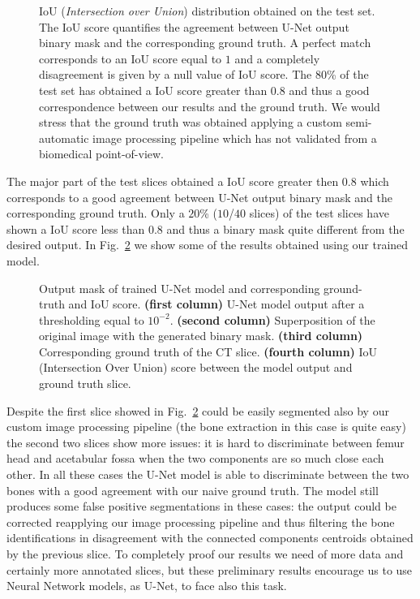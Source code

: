 \documentclass{standalone}
\begin{document}
\begin{figure}[htbp]
\centering
\def\svgwidth{0.85\textwidth}

\caption{IoU (\emph{Intersection over Union}) distribution obtained on the test set.
The IoU score quantifies the agreement between U-Net output binary mask and the corresponding ground truth.
A perfect match corresponds to an IoU score equal to $1$ and a completely disagreement is given by a null value of IoU score.
The $80$\% of the test set has obtained a IoU score greater than $0.8$ and thus a good correspondence between our results and the ground truth.
We would stress that the ground truth was obtained applying a custom semi-automatic image processing pipeline which has not validated from a biomedical point-of-view.
}
\label{fig:seg_iou}
\end{figure}

The major part of the test slices obtained a IoU score greater then $0.8$ which corresponds to a good agreement between U-Net output binary mask and the corresponding ground truth.
Only a $20$\% ($10$/$40$ slices) of the test slices have shown a IoU score less than $0.8$ and thus a binary mask quite different from the desired output.
In Fig.~\ref{fig:seg_res} we show some of the  results obtained using our trained model.

\begin{figure}[htbp]
\centering
\def\svgwidth{\textwidth}

\caption{Output mask of trained U-Net model and corresponding ground-truth and IoU score.
\textbf{(first column)} U-Net model output after a thresholding equal to $10^{-2}$.
\textbf{(second column)} Superposition of the original image with the generated binary mask.
\textbf{(third column)} Corresponding ground truth of the CT slice.
\textbf{(fourth column)} IoU (Intersection Over Union) score between the model output and ground truth slice.
}
\label{fig:seg_res}
\end{figure}

Despite the first slice showed in Fig.~\ref{fig:seg_res} could be easily segmented also by our custom image processing pipeline (the bone extraction in this case is quite easy) the second two slices show more issues: it is hard to discriminate between femur head and acetabular fossa when the two components are so much close each other.
In all these cases the U-Net model is able to discriminate between the two bones with a good agreement with our naive ground truth.
The model still produces some false positive segmentations in these cases: the output could be corrected reapplying our image processing pipeline and thus filtering the bone identifications in disagreement with the connected components centroids obtained by the previous slice.
To completely proof our results we need of more data and certainly more annotated slices, but these preliminary results encourage us to use Neural Network models, as U-Net, to face also this task.
\end{document}
